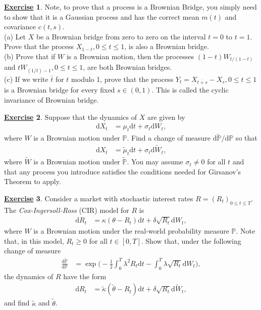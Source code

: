 \documentclass[12pt]{book}
\numberwithin{equation}{chapter}
\theoremstyle{plain}
\numberwithin{theorem}{section}
\theoremstyle{definition}
\newtheorem{exercise}{\underline{Exercise}}
\numberwithin{exercise}{chapter}
\newcommand{\<}{\langle}
\renewcommand{\>}{\rangle}
\renewcommand{\(}{\left(}
\renewcommand{\)}{\right)}
\renewcommand{\[}{\left[}
\renewcommand{\]}{\right]}
\newcommand\Pb{\mathds{P}}
\newcommand\sig{\sigma}
\newcommand\lam{\lambda}
\newcommand\del{\delta}
\newcommand\Pbt{\widetilde{\Pb}}
\newcommand\Wt{\widetilde{W}}
\newcommand\dd{\mathrm{d}}
\begin{document}
\begin{exercise}
\label{exer:8.6}
Note, to prove that a process is a Brownian Bridge, you simply need to show that it is a Gaussian process and has the correct mean $m(t)$ and covariance $c(t,s)$.
\\
(a) Let $X$ be a Brownian bridge from zero to zero on the interval $t=0$ to $t=1$.  
Prove that the process $X_{1-t}, 0 \leq t \leq 1$, is also a Brownian bridge.
\\
(b) Prove that if $W$ is a Brownian motion, then the processes $ (1-t)W_{t/(1-t)}$ and $t W_{(1/t)-1},  0 \leq t \leq 1$,
 are both Brownian bridges.
\\
(c) If we write $\bar{t}$ for $t$ modulo 1, prove that the process $Y_t = X_{\overline{t+s}} - X_s,  0 \leq t \leq 1$ is a Brownian bridge for every fixed $s \in (0,1)$. This is called the cyclic invariance of Brownian bridge.
\end{exercise}

\begin{exercise}
\label{exer:8.7}
Suppose that the dynamics of $X$ are given by
\begin{align}
\dd X_t
	&=	\mu_t \dd t + \sig_t \dd W_t ,
\end{align}
where $W$ is a Brownian motion under $\Pb$.  Find a change of measure $\dd \Pbt / \dd \Pb$ so that
\begin{align}
\dd X_t
	&=	\widetilde{\mu}_t \dd t + \sig_t \dd \Wt_t ,
\end{align}
where $\Wt$ is a Brownian motion under $\Pbt$.  You may assume $\sig_t \neq 0$ for all $t$ and that any process you introduce satisfies the conditions needed for Girsanov's Theorem to apply.
\end{exercise}

\begin{exercise}
\label{exer:8.8}
Consider a market with stochastic interest rates $R = (R_t)_{0 \leq t \leq T}$.  The \textit{Cox-Ingersoll-Ross} (CIR) model for $R$ is
\begin{align}
\dd R_t
	&=	\kappa ( \theta - R_t ) \dd t + \del \sqrt{R_t} \dd W_t ,
\end{align}
where $W$ is a Brownian motion under the real-world probability measure $\Pb$.  Note that, in this model, $R_t \geq 0$ for all $t \in [0,T]$.  Show that, under the following change of measure
\begin{align}
\frac{\dd \Pbt}{ \dd \Pb}
	&=	\exp \Big( -\frac{1}{2} \int_0^T \lam^2 R_t \dd t - \int_0^T \lam \sqrt{R_t } \dd W_t \Big) ,
\end{align}
the dynamics of $R$ have the form
\begin{align}
\dd R_t
	&=	\widetilde{\kappa} ( \widetilde{\theta} - R_t ) \dd t + \del \sqrt{R_t} \dd \Wt_t ,
\end{align}
and find $\widetilde{\kappa}$ and $\widetilde{\theta}$.
\end{exercise}
\end{document}
